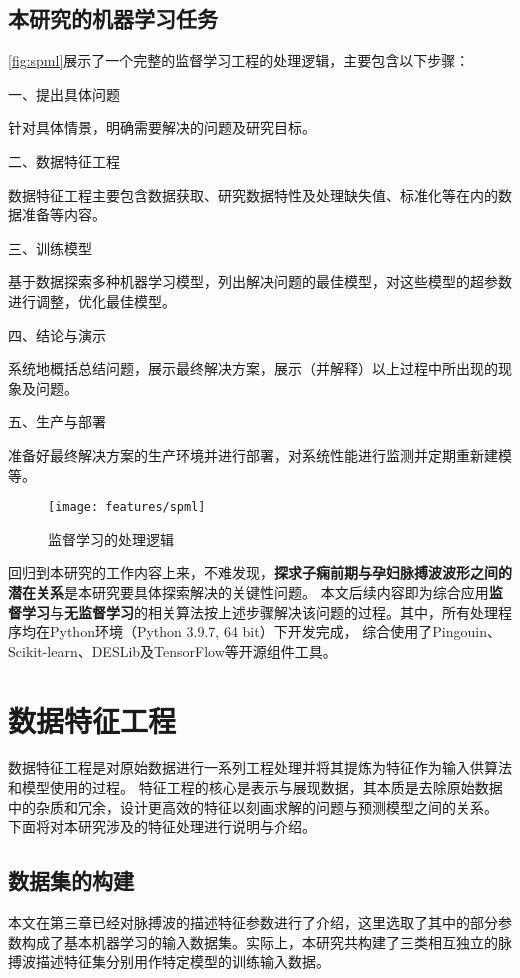 \subsection{本研究的机器学习任务}
\autoref{fig:spml}展示了一个完整的监督学习工程的处理逻辑，主要包含以下步骤\cite{Aurélien2018}：

一、提出具体问题

针对具体情景，明确需要解决的问题及研究目标。

二、数据特征工程

数据特征工程主要包含数据获取、研究数据特性及处理缺失值、标准化等在内的数据准备等内容。

三、训练模型

基于数据探索多种机器学习模型，列出解决问题的最佳模型，对这些模型的超参数进行调整，优化最佳模型。

四、结论与演示

系统地概括总结问题，展示最终解决方案，展示（并解释）以上过程中所出现的现象及问题。

五、生产与部署

准备好最终解决方案的生产环境并进行部署，对系统性能进行监测并定期重新建模等。
\begin{figure}[htbp]
  \centering
  \texttt{[image: features/spml]}
  \caption[监督学习的处理逻辑]{\label{fig:spml}监督学习的处理逻辑\cite{awad2015}}
\end{figure}

回归到本研究的工作内容上来，不难发现，\textbf{探求子痫前期与孕妇脉搏波波形之间的潜在关系}是本研究要具体探索解决的关键性问题。
本文后续内容即为综合应用\textbf{监督学习}与\textbf{无监督学习}的相关算法按上述步骤解决该问题的过程。其中，所有处理程序均在Python环境（Python 3.9.7, 64 bit）下开发完成，
综合使用了Pingouin、Scikit-learn、DESLib及TensorFlow等开源组件工具\cite{python,Vallat2018,scikit-learn,JMLR:v21:18-144,tensorflow2015-whitepaper}。

\section{数据特征工程}
数据特征工程是对原始数据进行一系列工程处理并将其提炼为特征作为输入供算法和模型使用的过程\cite{Zhou2016,Aurélien2018}。
特征工程的核心是表示与展现数据，其本质是去除原始数据中的杂质和冗余，设计更高效的特征以刻画求解的问题与预测模型之间的关系。
下面将对本研究涉及的特征处理进行说明与介绍。

\subsection{数据集的构建}
本文在第三章已经对脉搏波的描述特征参数进行了介绍，这里选取了其中的部分参数构成了基本机器学习的输入数据集。实际上，本研究共构建了三类相互独立的脉搏波描述特征集分别用作特定模型的训练输入数据。

